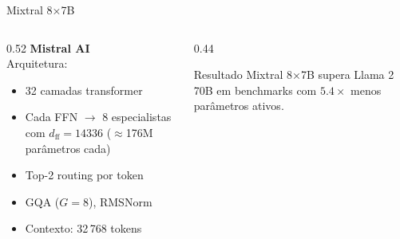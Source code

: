 \documentclass[aspectratio=169, xcolor=dvipsnames]{beamer}
\begin{document}
  \begin{frame}{Mixtral 8×7B\footnotemark[1]}
    \begin{columns}[T]
      \begin{column}{0.52\textwidth}
        \textbf{Mistral AI}\\[0.4em]
        Arquitetura:
        \begin{itemize}
          \item 32 camadas transformer
          \item Cada FFN $\to$ 8 especialistas com $d_\text{ff} = 14336$ ($\approx$176M parâmetros cada)
          \item Top-2 routing por token
          \item GQA ($G=8$), RMSNorm
          \item Contexto: 32\,768 tokens
        \end{itemize}
      \end{column}
      \begin{column}{0.44\textwidth}
        \vspace{0.3em}
        \begin{exampleblock}{Resultado}
          Mixtral 8×7B supera Llama 2 70B em benchmarks com $5.4\times$ menos parâmetros ativos.
        \end{exampleblock}
      \end{column}
    \end{columns}
  \end{frame}
\end{document}
